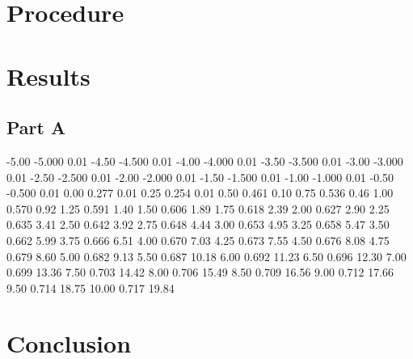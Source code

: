 \documentclass{article}
\begin{document}
\section{Procedure}
\label{sec:procedure}

%
%

\section{Results}
\label{sec:results}

\subsection{Part A}
\label{sec:result_a}

-5.00 -5.000 0.01
-4.50 -4.500 0.01
-4.00 -4.000 0.01
-3.50 -3.500 0.01
-3.00 -3.000 0.01
-2.50 -2.500 0.01
-2.00 -2.000 0.01
-1.50 -1.500 0.01
-1.00 -1.000 0.01
-0.50 -0.500 0.01
0.00 0.277 0.01
0.25 0.254 0.01
0.50 0.461 0.10
0.75 0.536 0.46
1.00 0.570 0.92
1.25 0.591 1.40
1.50 0.606 1.89
1.75 0.618 2.39
2.00 0.627 2.90
2.25 0.635 3.41
2.50 0.642 3.92
2.75 0.648 4.44
3.00 0.653 4.95
3.25 0.658 5.47
3.50 0.662 5.99
3.75 0.666 6.51
4.00 0.670 7.03
4.25 0.673 7.55
4.50 0.676 8.08
4.75 0.679 8.60
5.00 0.682 9.13
5.50 0.687 10.18
6.00 0.692 11.23
6.50 0.696 12.30
7.00 0.699 13.36
7.50 0.703 14.42
8.00 0.706 15.49
8.50 0.709 16.56
9.00 0.712 17.66
9.50 0.714 18.75
10.00 0.717 19.84

\section{Conclusion}
\label{sec:conclusion}
\end{document}
